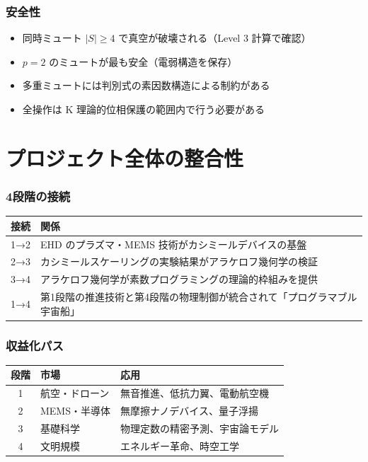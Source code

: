 \documentclass[11pt,a4paper]{article}
\begin{document}
\section{安全性}

\begin{honestbox}[制約]
\begin{itemize}
\item 同時ミュート $|S| \geq 4$ で真空が破壊される（Level 3 計算で確認）
\item $p=2$ のミュートが最も安全（電弱構造を保存）
\item 多重ミュートには判別式の素因数構造による制約がある
\item 全操作は K 理論的位相保護の範囲内で行う必要がある
\end{itemize}
\end{honestbox}

\part{プロジェクト全体の整合性}

\section{4段階の接続}

\begin{center}
\renewcommand{\arraystretch}{1.5}
\begin{tabular}{cp{10cm}}
\toprule
接続 & 関係 \\
\midrule
1→2 & EHD のプラズマ・MEMS 技術がカシミールデバイスの基盤 \\
2→3 & カシミールスケーリングの実験結果がアラケロフ幾何学の検証 \\
3→4 & アラケロフ幾何学が素数プログラミングの理論的枠組みを提供 \\
1→4 & 第1段階の推進技術と第4段階の物理制御が統合されて「プログラマブル宇宙船」 \\
\bottomrule
\end{tabular}
\end{center}

\section{収益化パス}

\begin{center}
\renewcommand{\arraystretch}{1.3}
\begin{tabular}{clp{7cm}}
\toprule
段階 & 市場 & 応用 \\
\midrule
1 & 航空・ドローン & 無音推進、低抗力翼、電動航空機 \\
2 & MEMS・半導体 & 無摩擦ナノデバイス、量子浮揚 \\
3 & 基礎科学 & 物理定数の精密予測、宇宙論モデル \\
4 & 文明規模 & エネルギー革命、時空工学 \\
\bottomrule
\end{tabular}
\end{center}
\end{document}
